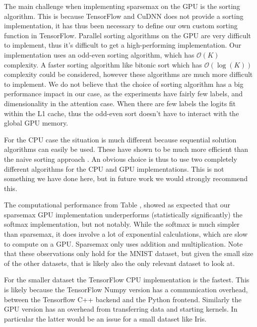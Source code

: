 The main challenge when implementing sparsemax on the GPU is the sorting algorithm. This is because TensorFlow and CuDNN does not provide a sorting implementation, it has thus been necessary to define our own custom sorting function in TensorFlow. Parallel sorting algorithms on the GPU are very difficult to implement, thus it's difficult to get a high-performing implementation. Our implementation uses an odd-even sorting algorithm, which has $\mathcal{O}(K)$ complexity. A faster sorting algorithm like bitonic sort which has $\mathcal{O}(\log(K))$ complexity could be considered, however these algorithms are much more difficult to implement. We do not believe that the choice of sorting algorithm has a big performance impact in our case, as the experiments have fairly few labels, and dimensionality in the attention case. When there are few labels the logits fit within the L1 cache, thus the odd-even sort doesn't have to interact with the global GPU memory. 

For the CPU case the situation is much different because sequential solution algorithms can easily be used. These have shown to be much more efficient than the naive sorting approach \cite{Liu2016}. An obvious choice is thus to use two completely different algorithms for the CPU and GPU implementations. This is not something we have done here, but in future work we would strongly recommend this.

The computational performance from Table \label{tab:timings}, showed as expected that our sparsemax GPU implementation underperforms (statistically significantly) the softmax implementation, but not notably. While the softmax is much simpler than sparsemax, it does involve a lot of exponential calculations, which are slow to compute on a GPU. Sparsemax only uses addition and multiplication. Note that these observations only hold for the MNIST dataset, but given the small size of the other datasets, that is likely also the only relevant dataset to look at.

For the smaller dataset the TensorFlow CPU implementation is the fastest. This is likely because the TensorFlow Numpy version has a communication overhead, between the Tensorflow C++ backend and the Python frontend. Similarly the GPU version has an overhead from transferring data and starting kernels. In particular the latter would be an issue for a small dataset like Iris.

